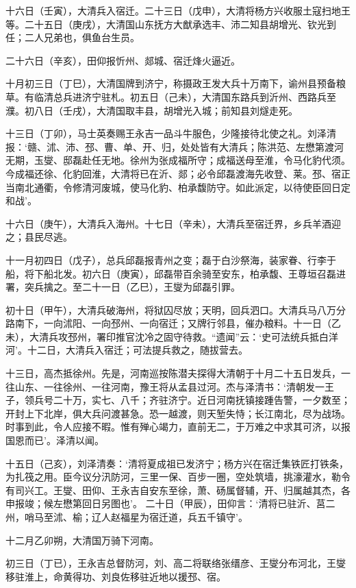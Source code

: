 \documentclass[]{article}
\begin{document}
十六日（壬寅），大清兵入宿迁。二十三日（戊申），大清将杨方兴收服土寇扫地王等。二十五日（庚戌），大清国山东抚方大猷承选丰、沛二知县胡增光、钦光到任；二人兄弟也，俱鱼台生员。

二十六日（辛亥），田仰报忻州、郯城、宿迁烽火逼近。

十月初三日（丁巳），大清国牌到济宁，称摄政王发大兵十万南下，谕州县预备粮草。有临清总兵进济宁驻札。初五日（己未），大清国东路兵到沂州、西路兵至濮。初八日（壬戌），大清国取丰县，胡增光入城；前知县刘燧走死。

十三日（丁卯），马士英奏赐王永吉一品斗牛服色，少隆接待北使之礼。刘泽清报：`赣、沭、沛、邳、曹、单、开、归，处处皆有大清兵；陈洪范、左懋第渡河无期，玉燮、邸磊赴任无地。徐州为张成福所守；成福送母至淮，令马化豹代须。今成福还徐、化豹回淮，大清将已在沂、郯；必令邱磊渡海先收登、莱。邳、宿正当南北通衢，令修清河废城，使马化豹、柏承馥防守。如此派定，以待使臣回日定和战'。

十六日（庚午），大清兵入海州。十七日（辛未），大清兵至宿迁界，乡兵羊酒迎之；县民尽逃。

十一月初四日（戊子），总兵邱磊报青州之变；磊于白沙祭海，装家眷、行李于船，将下船北发。初六日（庚寅），邱磊带百余骑至安东，柏承馥、王尊垣召磊进署，突兵擒之。至二十一日（乙巳），王燮为邱磊引罪。

初十日（甲午），大清兵破海州，将狱囚尽放；天明，回兵泗口。大清兵马八万分路南下，一向沭阳、一向邳州、一向宿迁；又牌行邻县，催办粮料。十一日（乙未），大清兵攻邳州，署印推官沈冷之固守待救。``遗闻''云：`史可法统兵抵白洋河'。十二日，大清兵入宿迁；可法提兵救之，随拔营去。

十三日，高杰抵徐州。先是，河南巡按陈潜夫探得大清朝于十月二十五日发兵，一往山东、一往徐州、一往河南，豫王将从孟县过河。杰与泽清书：`清朝发一王子，领兵号二十万，实七、八千；齐驻济宁。近日河南抚镇接踵告警，一夕数至；开封上下北岸，俱大兵问渡甚急。恐一越渡，则天堑失恃；长江南北，尽为战场。时事到此，令人应接不暇。惟有殚心竭力，直前无二，于万难之中求其可济，以报国恩而已'。泽清以闻。

十五日（己亥），刘泽清奏：`清将夏成祖已发济宁；杨方兴在宿迁集铁匠打铁条，为扎筏之用。臣今议分汛防河，三里一保、百步一圈，空处筑墙，挑濠灌水，勒令有司兴工。王燮、田仰、王永吉自安东至徐，萧、砀属督辅，开、归属越其杰，各申报竣；候左懋第回日另图也'。
二十日（甲辰），田仰言：`清将已驻沂、莒二州，哨马至沭、榆；辽人赵福星为宿迁道，兵五千镇守'。

十二月乙卯朔，大清国万骑下河南。

初三日（丁已），王永吉总督防河，刘、高二将联络张缙彦、王燮分布河北，王燮移驻淮上，命黄得功、刘良佐移驻近地以援邳、宿。
\end{document}
